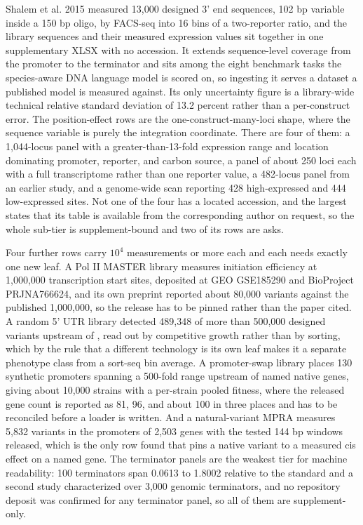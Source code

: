  Shalem et al. 2015 measured 13,000 designed
3' end sequences, 102 bp variable inside a 150 bp oligo, by FACS-seq into 16 bins of a
two-reporter ratio, and the library sequences and their measured expression values sit together
in one supplementary XLSX with no accession. It extends sequence-level coverage from the
promoter to the terminator and sits among the eight benchmark tasks the species-aware DNA
language model is scored on, so ingesting it serves a dataset a published model is measured
against. Its only uncertainty figure is a library-wide technical relative standard deviation of
13.2 percent rather than a per-construct error. The position-effect rows are the
one-construct-many-loci shape, where the sequence variable is purely the integration
coordinate. There are four of them: a 1,044-locus panel with a greater-than-13-fold expression
range and location dominating promoter, reporter, and carbon source, a panel of about 250 loci
each with a full transcriptome rather than one reporter value, a 482-locus panel from an
earlier study, and a genome-wide scan reporting 428 high-expressed and 444 low-expressed
sites. Not one of the four has a located accession, and the largest states that its table is
available from the corresponding author on request, so the whole sub-tier is supplement-bound
and two of its rows are asks.

 Four further rows carry $10^{4}$ measurements or
more each and each needs exactly one new leaf. A Pol II MASTER library measures initiation
efficiency at 1,000,000 transcription start sites, deposited at GEO GSE185290 and BioProject
PRJNA766624, and its own preprint reported about 80,000 variants against the published
1,000,000, so the release has to be pinned rather than the paper cited. A random 5' UTR library
detected 489,348 of more than 500,000 designed variants upstream of , read out by
competitive growth rather than by sorting, which by the rule that a different technology is its
own leaf makes it a separate phenotype class from a sort-seq bin average. A promoter-swap
library places 130 synthetic promoters spanning a 500-fold range upstream of named native
genes, giving about 10,000 strains with a per-strain pooled fitness, where the released gene
count is reported as 81, 96, and about 100 in three places and has to be reconciled before a
loader is written. And a natural-variant MPRA measures 5,832 variants in the promoters of 2,503
genes with the tested 144 bp windows released, which is the only row found that pins a native
variant to a measured cis effect on a named gene. The terminator panels are the weakest tier
for machine readability: 100 terminators span 0.0613 to 1.8002 relative to the 
standard and a second study characterized over 3,000 genomic terminators, and no repository
deposit was confirmed for any terminator panel, so all of them are supplement-only.

